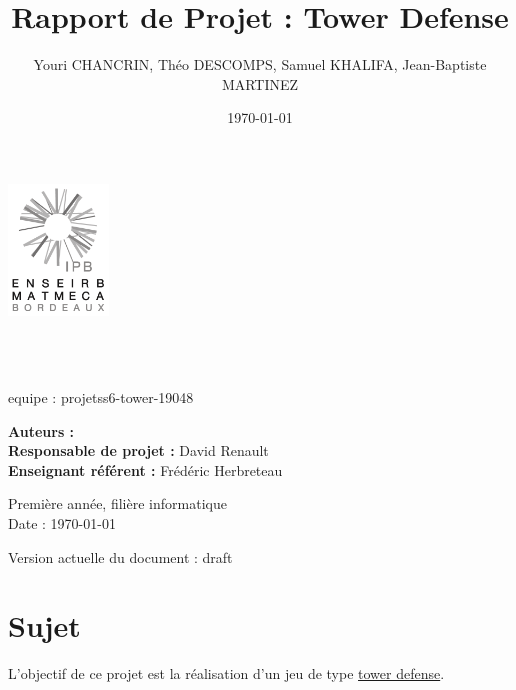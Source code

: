 \documentclass{article}
\title{Rapport de Projet : Tower Defense}
\author{Youri CHANCRIN, Théo DESCOMPS, Samuel KHALIFA, Jean-Baptiste MARTINEZ}
\date{\today}
\makeatletter
\let\mytitle\@title
\let\myauthor\@author
\makeatother
\begin{document}
\begin{flushleft}

\thispagestyle{empty}
\includegraphics[width=0.2\textwidth]{enseirb-matmeca}
\graphicspath{{./img/}}


\hrulefill \\[2em]
\begin{center}
\textbf{\Huge \mytitle}\\[0.8em]
{\large equipe : projetss6-tower-19048}
\\[0.8em]
\end{center}
\hrulefill


{\large \textbf{Auteurs :} \myauthor}\\
{\large \textbf{Responsable de projet :} David Renault}\\
{\large \textbf{Enseignant référent :} Frédéric Herbreteau}


\begin{center}
  Première année, filière informatique\\
  Date : \today
\end{center}


\hfill Version actuelle du document : draft

\end{flushleft}

\newpage

\tableofcontents

\newpage

\section{Sujet}
L'objectif de ce projet est la réalisation d'un jeu de type \hyperlink{https://fr.wikipedia.org/wiki/Tower_defense}{tower defense}.
\end{document}
